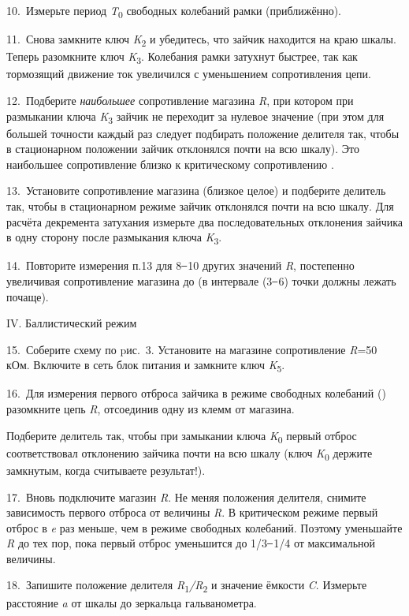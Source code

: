 \documentclass[]{article}
\begin{document}
10.~Измерьте период \emph{T}\textsubscript{0} свободных колебаний рамки
(приближённо).

11.~Снова замкните ключ \emph{K}\textsubscript{2} и убедитесь, что
зайчик находится на краю шкалы. Теперь разомкните ключ
\emph{K}\textsubscript{3}. Колебания рамки затухнут быстрее, так как
тормозящий движение ток увеличился с уменьшением сопротивления цепи.

12.~Подберите \emph{наибольшее} сопротивление магазина \emph{R}, при
котором при размыкании ключа \emph{K}\textsubscript{3} зайчик не
переходит за нулевое значение (при этом для большей точности каждый раз
следует подбирать положение делителя так, чтобы в стационарном положении
зайчик отклонялся почти на всю шкалу). Это наибольшее сопротивление
близко к критическому сопротивлению .

13.~Установите сопротивление магазина (близкое целое) и подберите
делитель так, чтобы в стационарном режиме зайчик отклонялся почти на всю
шкалу. Для расчёта декремента затухания измерьте два последовательных
отклонения зайчика в одну сторону после размыкания ключа
\emph{K}\textsubscript{3}.

14.~Повторите измерения п.13 для 8 ̶ 10 других значений \emph{R},
постепенно увеличивая сопротивление магазина до (в интервале (3 ̶ 6)
точки должны лежать почаще).

IV. Баллистический режим

15.~Соберите схему по pис.~3. Установите на магазине сопротивление
\emph{R}=50 кОм. Включите в сеть блок питания и замкните ключ
\emph{K}\textsubscript{5}.

16.~Для измерения первого отброса зайчика в режиме свободных колебаний
() разомкните цепь \emph{R}, отсоединив одну из клемм от магазина.

Подберите делитель так, чтобы при замыкании ключа
\emph{K}\textsubscript{0} первый отброс соответствовал отклонению
зайчика почти на всю шкалу (ключ \emph{K}\textsubscript{0} держите
замкнутым, когда считываете результат!).

17.~Вновь подключите магазин \emph{R}. Не меняя положения делителя,
снимите зависимость первого отброса от величины \emph{R}. В критическом
режиме первый отброс в \emph{e} раз меньше, чем в режиме свободных
колебаний. Поэтому уменьшайте \emph{R} до тех пор, пока первый отброс
уменьшится до 1/3 ̶ 1/4 от максимальной величины.

18.~Запишите положение делителя
\emph{R}\textsubscript{1}\emph{/R}\textsubscript{2} и значение ёмкости
\emph{C}. Измерьте расстояние \emph{a} от шкалы до зеркальца
гальванометра.
\end{document}
